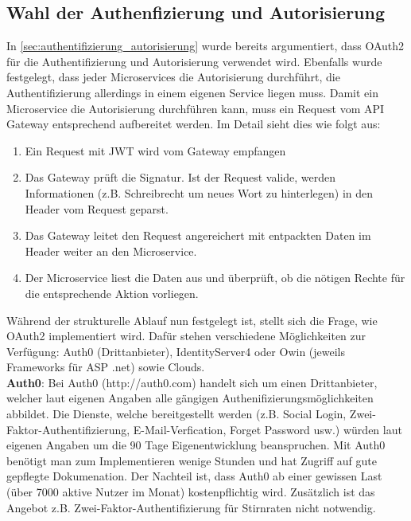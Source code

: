 {\subsection{Wahl der Authenfizierung und Autorisierung} \label{sec:concept_authentifizierung_autorisierung}

In \ref{sec:authentifizierung_autorisierung} wurde bereits argumentiert, dass OAuth2 für die Authentifizierung und Autorisierung verwendet wird. Ebenfalls wurde festgelegt, dass jeder Microservices die Autorisierung durchführt, die Authentifizierung allerdings in einem eigenen Service liegen muss. Damit ein Microservice die Autorisierung durchführen kann, muss ein Request vom API Gateway entsprechend aufbereitet werden. Im Detail sieht dies wie folgt aus\cite{richardson2019mic_pattern}:\\
\begin{enumerate}
	\item  Ein Request mit JWT wird vom Gateway empfangen
	\item Das Gateway prüft die Signatur. Ist der Request valide, werden Informationen (z.B. Schreibrecht um neues Wort zu hinterlegen) in den Header vom Request geparst. 
	\item Das Gateway leitet den Request angereichert mit entpackten Daten im Header weiter an den Microservice.
	\item Der Microservice liest die Daten aus und überprüft, ob die nötigen Rechte für die entsprechende Aktion vorliegen.
\end{enumerate}

Während der strukturelle Ablauf nun festgelegt ist, stellt sich die Frage, wie OAuth2 implementiert wird. Dafür stehen verschiedene Möglichkeiten zur Verfügung: Auth0 (Drittanbieter), IdentityServer4 oder Owin (jeweils Frameworks für ASP .net) sowie Clouds.\\

\textbf{Auth0}: Bei Auth0 (http://auth0.com) handelt sich um einen Drittanbieter, welcher laut eigenen Angaben alle gängigen Authenifizierungsmöglichkeiten abbildet. Die Dienste, welche bereitgestellt werden (z.B. Social Login, Zwei-Faktor-Authentifizierung, E-Mail-Verfication, Forget Password usw.) würden laut eigenen Angaben um die 90 Tage Eigenentwicklung beanspruchen. Mit Auth0 benötigt man zum Implementieren wenige Stunden und hat Zugriff auf gute gepflegte Dokumenation. Der Nachteil ist, dass Auth0 ab einer gewissen Last (über 7000 aktive Nutzer im Monat) kostenpflichtig wird. Zusätzlich ist das Angebot z.B. Zwei-Faktor-Authentifizierung für Stirnraten nicht notwendig.\\

}
